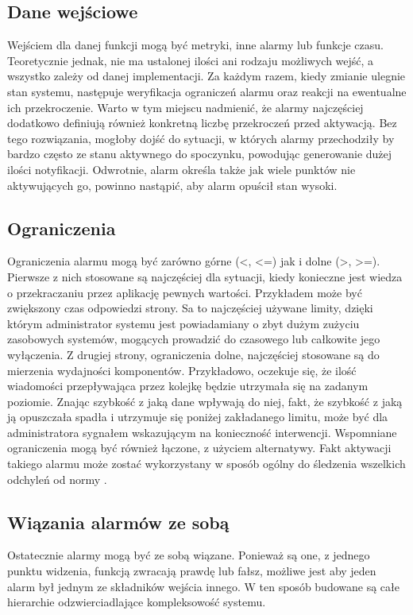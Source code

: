     \subsection{Dane wejściowe}
    Wejściem dla danej funkcji mogą być metryki, inne alarmy lub funkcje czasu. Teoretycznie jednak, nie ma ustalonej
    ilości ani rodzaju możliwych wejść, a wszystko zależy od danej implementacji. Za każdym razem, kiedy 
    zmianie ulegnie stan systemu, następuje weryfikacja ograniczeń alarmu oraz reakcji na ewentualne ich
    przekroczenie. Warto w tym miejscu nadmienić, że alarmy najczęściej dodatkowo definiują również 
    konkretną liczbę przekroczeń przed aktywacją. Bez tego rozwiązania, mogłoby dojść do sytuacji, w których
    alarmy przechodziły by bardzo często ze stanu aktywnego do spoczynku, powodując generowanie dużej ilości notyfikacji. Odwrotnie, alarm określa także jak wiele punktów nie aktywujących go, powinno
    nastąpić, aby alarm opuścił stan wysoki.
    
    \subsection{Ograniczenia}
    Ograniczenia alarmu mogą być zarówno górne (<, <=) jak i dolne (>, >=). Pierwsze z nich stosowane są
    najczęściej dla sytuacji, kiedy konieczne jest wiedza o przekraczaniu przez aplikację pewnych wartości.
    Przykładem może być zwiększony czas odpowiedzi strony. Sa to najczęściej używane limity, dzięki którym
    administrator systemu jest powiadamiany o zbyt dużym zużyciu zasobowych systemów, mogących prowadzić
    do czasowego lub całkowite jego wyłączenia. Z drugiej strony, ograniczenia dolne, najczęściej
    stosowane są do mierzenia wydajności komponentów. Przykładowo, oczekuje się, że ilość wiadomości
    przepływająca przez kolejkę będzie utrzymała się na zadanym poziomie. Znając szybkość z jaką dane 
    wpływają do niej, fakt, że szybkość z jaką ją opuszczała spadła i utrzymuje się poniżej zakładanego
    limitu, może być dla administratora sygnałem wskazującym na konieczność interwencji.
    Wspomniane ograniczenia mogą być również łączone, z użyciem alternatywy. Fakt aktywacji takiego
    alarmu może zostać wykorzystany w sposób ogólny do śledzenia wszelkich odchyleń od normy \cite{monitoring_and_alerting}.
    
    \subsection{Wiązania alarmów ze sobą}
    Ostatecznie alarmy mogą być ze sobą wiązane. Ponieważ są one, z jednego punktu widzenia, funkcją
    zwracają prawdę lub fałsz, możliwe jest aby jeden alarm był jednym ze składników wejścia innego.
    W ten sposób budowane są całe hierarchie odzwierciadlające kompleksowość systemu. 
    
